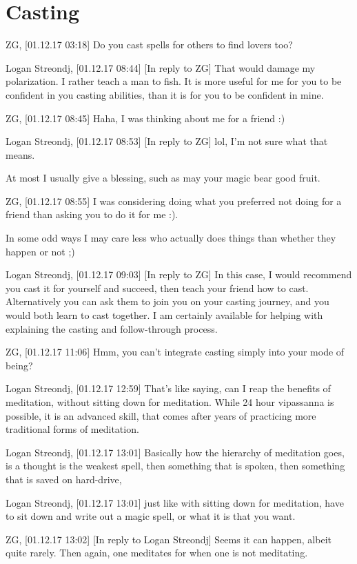 \section{Casting}
ZG, [01.12.17 03:18]
Do you cast spells for others to find lovers too?

Logan Streondj, [01.12.17 08:44]
[In reply to ZG]
That would damage my polarization. 
I rather teach a man to fish. 
It is more useful for me for you to be confident in you casting abilities,
than it is for you to be confident in mine.

ZG, [01.12.17 08:45]
Haha, I was thinking about me for a friend :)

Logan Streondj, [01.12.17 08:53]
[In reply to ZG]
lol, I'm not sure what that means.

At most I usually give a blessing, such as may your magic bear good fruit.

ZG, [01.12.17 08:55]
I was considering doing what you preferred not doing for a friend than asking
you to do it for me :).

In some odd ways I may care less who actually does things than whether they
happen or not ;)

Logan Streondj, [01.12.17 09:03]
[In reply to ZG]
In this case, I would recommend you cast it for yourself and succeed, then teach
your friend how to cast.
Alternatively you can ask them to join you on your casting journey,  and you
would both learn to cast together. 
I am certainly available for helping with explaining the casting and
follow-through process.

ZG, [01.12.17 11:06]
Hmm, you can't integrate casting simply into your mode of being?

Logan Streondj, [01.12.17 12:59]
That's like saying, can I reap the benefits of meditation, without sitting down
for meditation.
While 24 hour vipassanna is possible, it is an advanced skill, that comes after
years of practicing more traditional forms of meditation.

Logan Streondj, [01.12.17 13:01]
Basically how the hierarchy of meditation goes, 
is a thought is the weakest spell,
then something that is spoken, 
then something that is saved on hard-drive,

Logan Streondj, [01.12.17 13:01]
just like with sitting down for meditation, have to sit down and write out a
magic spell, or what it is that you want.

ZG, [01.12.17 13:02]
[In reply to Logan Streondj]
Seems it can happen, albeit quite rarely. Then again, one meditates for when one
is not meditating.

